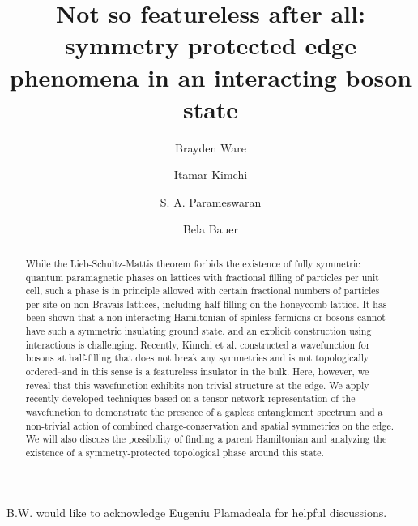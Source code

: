 \documentclass[twocolumn,english,prb,showpacs,superscriptaddress]{revtex4-1}
\begin{document}
\title{Not so featureless after all: \\ symmetry protected edge phenomena in an interacting boson state}

\author{Brayden Ware}

\author{Itamar Kimchi}

\author{S. A. Parameswaran}

\author{Bela Bauer}

\begin{abstract}
While the Lieb-Schultz-Mattis theorem forbids the existence of fully
symmetric quantum paramagnetic phases on lattices with fractional
filling of particles per unit cell, such a phase is in principle
allowed with certain fractional numbers of particles per site on
non-Bravais lattices, including half-filling on the honeycomb lattice.
It has been shown that a non-interacting Hamiltonian of spinless
fermions or bosons cannot have such a symmetric insulating ground
state, and an explicit construction using interactions is challenging.
Recently, Kimchi et al. constructed a wavefunction for bosons at
half-filling that does not break any symmetries and is not
topologically ordered--and in this sense is a featureless insulator in
the bulk. Here, however, we reveal that this wavefunction exhibits
non-trivial structure at the edge. We apply recently developed
techniques based on a tensor network representation of the
wavefunction to demonstrate the presence of a gapless entanglement
spectrum and a non-trivial action of combined charge-conservation and
spatial symmetries on the edge. We will also discuss the possibility
of finding a parent Hamiltonian and analyzing the existence of a
symmetry-protected topological phase around this state.
\end{abstract}
\maketitle








\acknowledgements
B.W. would like to acknowledge Eugeniu Plamadeala for helpful discussions.


\end{document}
